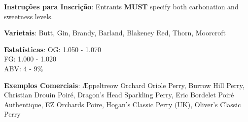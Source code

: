 \textbf{Instruções para Inscrição}: Entrants \textbf{MUST} specify both carbonation and sweetness levels.

\textbf{Varietais}: Butt, Gin, Brandy, Barland, Blakeney Red, Thorn, Moorcroft

\textbf{Estatísticas}: OG: 1.050 - 1.070 \\
\phantom{ } \hspace{16.5mm} FG: 1.000 - 1.020 \\
\phantom{ } \hspace{16.5mm} ABV: 4 - 9\%

\textbf{Exemplos Comerciais}: Æppeltreow Orchard Oriole Perry, Burrow Hill Perry, Christian Drouin Poiré, Dragon's Head Sparkling Perry, Eric Bordelet Poiré Authentique, EZ Orchards Poire, Hogan's Classic Perry (UK), Oliver's Classic Perry